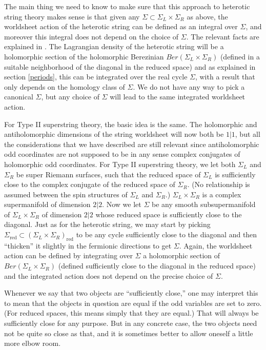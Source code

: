 \documentclass[11pt,a4paper]{article}
\def\SIgma{\Sigma}
\def\red{{\mathrm{red}}}
\begin{document}
The main thing we need to know to make sure that this approach to heterotic string theory  makes sense is that given any $\Sigma\subset
\Sigma_L\times \Sigma_R $ as above, the worldsheet action of the heterotic string
can be defined as an integral over $\Sigma$, and moreover this integral does not depend on the choice of $\Sigma$.  The relevant facts
are explained in \cite{supersurf}.  
 The Lagrangian density of the heterotic string will be a holomorphic section of
the holomorphic Berezinian  $\mathit{Ber}(\SIgma_L\times \Sigma_R)$ (defined in a suitable neighborhood of the diagonal in the reduced space)
and as explained in section \ref{periods}, this can be integrated over the real cycle $\Sigma$, with a result that only depends on the homology
class of $\Sigma$.  We do not have any way to pick a canonical $\Sigma$, but any choice of $\Sigma$ will lead to the same integrated worldsheet
action.

For Type II superstring theory, the basic idea is the same. The holomorphic and antiholomorphic dimensions of the string worldsheet will
now both be $1|1$, but all the considerations that we have described are still relevant since antiholomorphic odd coordinates are not
supposed to be in any sense complex conjugates of holomorphic odd coordinates.  For Type II superstring theory, we let both $\Sigma_L$
and $\Sigma_R$ be super Riemann surfaces, such that the reduced space of $\Sigma_L$ is sufficiently close to the complex
conjugate of the reduced space of $\Sigma_R$. (No relationship is assumed between the spin structures of $\Sigma_L$ and $\Sigma_R$.)  $\Sigma_L\times \Sigma_R$ is a complex supermanifold of dimension $2|2$.
Now we let $\SIgma$ be any smooth subsupermanifold of $\Sigma_L\times \Sigma_R$ of dimension $2|2$ whose reduced space is sufficiently
close to the diagonal.  Just as for the heterotic string, 
we may start by picking $\Sigma_\red\subset (\SIgma_L\times \Sigma_R)_\red$ to be any cycle sufficiently close to the diagonal 
and then ``thicken'' it slightly in the fermionic directions to get
$\Sigma$.
Again, the worldsheet action can be defined by integrating over $\Sigma$ a holomorphic section of $\mathit{Ber}(\Sigma_L\times \SIgma_R)$
(defined sufficiently close to the diagonal in the reduced space) and the integrated action does not depend on the precise choice of $\Sigma$.

Whenever we say that two objects are ``sufficiently close,'' one may interpret this to mean that the objects in question are equal if
the odd variables are set to zero. (For reduced spaces, this means simply that they are equal.) 
That will always be sufficiently close for any purpose. But in any concrete case, the two objects
need not be quite so close as that, and it is sometimes better to allow oneself a little more elbow room.
\end{document}

